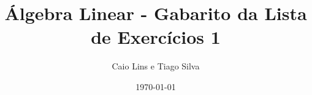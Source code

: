 \documentclass[leqno]{article}
\numberwithin{equation}{section}
\begin{document}
% 

\newcommand{\ds}{\displaystyle} \newcommand{\nl}{\newline}
\newcommand{\eps}{\varepsilon} \newcommand{\ssty}{\scriptstyle}
\newcommand{\bE}{\mathbb{E}}
\newcommand{\cB}{\mathcal{B}}
\newcommand{\cF}{\mathcal{F}}
\newcommand{\cA}{\mathcal{A}}
\newcommand{\cM}{\mathcal{M}}
\newcommand{\cD}{\mathcal{D}}
\newcommand{\cN}{\mathcal{N}}
\newcommand{\cL}{\mathcal{L}}
\newcommand{\cLN}{\mathcal{LN}}
\newcommand{\bP}{\mathbb{P}}
\newcommand{\bQ}{\mathbb{Q}}
\newcommand{\bN}{\mathbb{N}}
\newcommand{\bR}{\mathbb{R}}
\newcommand{\bZ}{\mathbb{Z}}

\newcommand{\bfw}{\mathbf{w}}
\newcommand{\bfv}{\mathbf{v}}
\newcommand{\bfu}{\mathbf{u}}
\newcommand{\bfb}{\mathbf{b}}
\newcommand{\bfx}{\mathbf{x}}
\newcommand{\bfa}{\mathbf{a}}

\newcommand{\bvecc}[2]{%
  \begin{bmatrix} #1 \\ #2  \end{bmatrix}
}
\newcommand{\bveccc}[3]{%
  \begin{bmatrix} #1 \\ #2 \\ #3  \end{bmatrix}
}


\title{Álgebra Linear - Gabarito da Lista de Exercícios 1}

\author{Caio Lins e Tiago Silva}

\date{\today}

\maketitle
\end{document}
